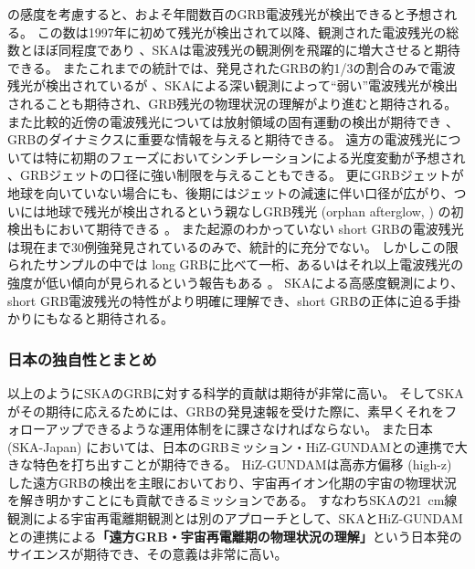 \skamid{}の感度を考慮すると、およそ年間数百のGRB電波残光が検出できると予想される。
この数は1997年に初めて残光が検出されて以降、観測された電波残光の総数とほぼ同程度であり \citep{2012ApJ...746..156C}、SKAは電波残光の観測例を飛躍的に増大させると期待できる。
またこれまでの統計では、発見されたGRBの約1/3の割合のみで電波残光が検出されているが \citep{2012ApJ...746..156C}、SKAによる深い観測によって``弱い''電波残光が検出されることも期待され、GRB残光の物理状況の理解がより進むと期待される。
また比較的近傍の電波残光については放射領域の固有運動の検出が期待でき \citep{2004ApJ...609L...1T}、GRBのダイナミクスに重要な情報を与えると期待できる。
遠方の電波残光については特に初期のフェーズにおいてシンチレーションによる光度変動が予想され \citep{1997Natur.389..261F}、GRBジェットの口径に強い制限を与えることもできる。
更にGRBジェットが地球を向いていない場合にも、後期にはジェットの減速に伴い口径が広がり、ついには地球で残光が検出されるという親なしGRB残光 (orphan afterglow, ) の初検出も\skasur{}において期待できる \citep{2015arXiv150104629B}。
また起源のわかっていない short GRBの電波残光は現在まで30例強発見されているのみで、統計的に充分でない。
しかしこの限られたサンプルの中では long GRBに比べて一桁、あるいはそれ以上電波残光の強度が低い傾向が見られるという報告もある \citep{2012ApJ...746..156C}。
SKAによる高感度観測により、short GRB電波残光の特性がより明確に理解でき、short GRBの正体に迫る手掛かりにもなると期待される。

\subsubsection{日本の独自性とまとめ}
以上のようにSKAのGRBに対する科学的貢献は期待が非常に高い。
そしてSKAがその期待に応えるためには、GRBの発見速報を受けた際に、素早くそれをフォローアップできるような運用体制をに課さなければならない。
また日本 (SKA-Japan) においては、日本のGRBミッション・HiZ-GUNDAMとの連携で大きな特色を打ち出すことが期待できる。
HiZ-GUNDAMは高赤方偏移 (high-z) した遠方GRBの検出を主眼においており、宇宙再イオン化期の宇宙の物理状況を解き明かすことにも貢献できるミッションである。
すなわちSKAの21~cm線観測による宇宙再電離期観測とは別のアプローチとして、SKAとHiZ-GUNDAMとの連携による{\bf 「遠方GRB・宇宙再電離期の物理状況の理解」}という日本発のサイエンスが期待でき、その意義は非常に高い。


